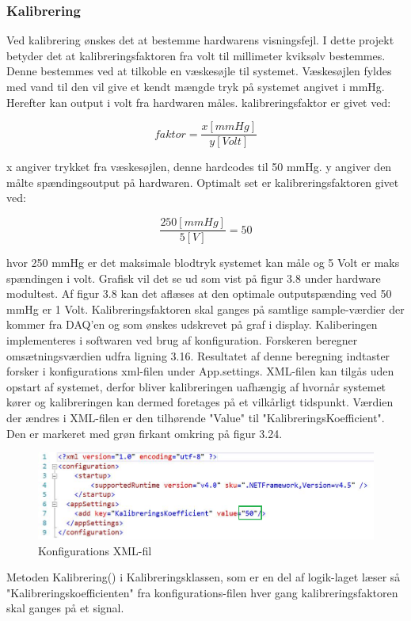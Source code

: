 \subsubsection{Kalibrering}
Ved kalibrering ønskes det at bestemme hardwarens visningsfejl. I dette projekt betyder det at kalibreringsfaktoren fra volt til millimeter kviksølv bestemmes. Denne bestemmes ved at tilkoble en væskesøjle til systemet. Væskesøjlen fyldes med vand til den vil give et kendt mængde tryk på systemet angivet i mmHg. Herefter kan output i volt fra hardwaren måles. kalibreringsfaktor er givet ved:
\begin{ceqn}
\begin{equation}
faktor=\dfrac{x [mmHg]}{y [Volt]}
\end{equation}
\end{ceqn}
x angiver trykket fra væskesøjlen, denne hardcodes til 50 mmHg. y angiver den målte spændingsoutput på hardwaren. Optimalt set er kalibreringsfaktoren givet ved:
\begin{ceqn}
\begin{equation}
\dfrac{250 [mmHg]}{5 [V]}=50
\end{equation}
\end{ceqn}
hvor 250 mmHg er det maksimale blodtryk systemet kan måle og 5 Volt er maks spændingen i volt. Grafisk vil det se ud som vist på figur 3.8 under hardware modultest. Af figur 3.8 kan det aflæses at den optimale outputspænding ved 50 mmHg er 1 Volt. Kalibreringsfaktoren skal ganges på samtlige sample-værdier der kommer fra DAQ’en og som ønskes udskrevet på graf i display. 
Kaliberingen implementeres i softwaren ved brug af konfiguration. Forskeren beregner omsætningsværdien udfra ligning 3.16. Resultatet af denne beregning indtaster forsker i konfigurations xml-filen under App.settings. XML-filen kan tilgås uden opstart af systemet, derfor bliver kalibreringen uafhængig af hvornår systemet kører og kalibreringen kan dermed foretages på et vilkårligt tidspunkt. Værdien der ændres i XML-filen er den tilhørende "Value" til "KalibreringsKoefficient". Den er markeret med grøn firkant omkring på figur 3.24.
\begin{figure}[H]
	\centering
	\includegraphics[width=1.0\textwidth]{Figurer/XMLConfig}
	\caption{Konfigurations XML-fil}
\end{figure}
Metoden Kalibrering() i Kalibreringsklassen, som er en del af logik-laget læser så "Kalibreringskoefficienten" fra konfigurations-filen hver gang kalibreringsfaktoren skal ganges på et signal. 

